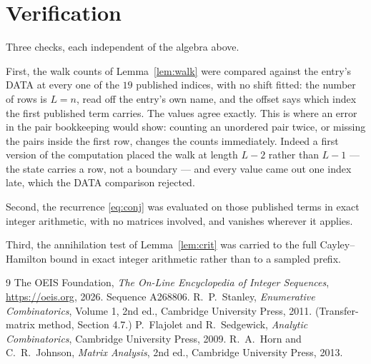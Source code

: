 \documentclass[11pt,a4paper]{article}
\theoremstyle{plain}
\theoremstyle{definition}
\begin{document}
\section{Verification}

Three checks, each independent of the algebra above.

First, the walk counts of Lemma~\ref{lem:walk} were compared against the entry's DATA at
every one of the $19$ published indices, with no shift fitted: the number of rows is
$L=n$, read off the entry's own name, and the offset says which index the first
published term carries. The values agree exactly. This is where an error in the pair
bookkeeping would show: counting an unordered pair twice, or missing the pairs inside the
first row, changes the counts immediately. Indeed a first version of the computation
placed the walk at length $L-2$ rather than $L-1$ --- the state carries a row, not a
boundary --- and every value came out one index late, which the DATA comparison rejected.

Second, the recurrence \eqref{eq:conj} was evaluated on those published terms in exact
integer arithmetic, with no matrices involved, and vanishes wherever it applies.

Third, the annihilation test of Lemma~\ref{lem:crit} was carried to the full
Cayley--Hamilton bound in exact integer arithmetic rather than to a sampled prefix.

\begin{thebibliography}{9}
 The OEIS Foundation, \emph{The On-Line Encyclopedia of Integer
Sequences}, \url{https://oeis.org}, 2026. Sequence A268806.
 R.~P.~Stanley, \emph{Enumerative Combinatorics}, Volume 1, 2nd ed.,
Cambridge University Press, 2011. (Transfer-matrix method, Section 4.7.)
 P.~Flajolet and R.~Sedgewick, \emph{Analytic Combinatorics}, Cambridge
University Press, 2009.
 R.~A.~Horn and C.~R.~Johnson, \emph{Matrix Analysis}, 2nd ed., Cambridge
University Press, 2013.
\end{thebibliography}
\end{document}
